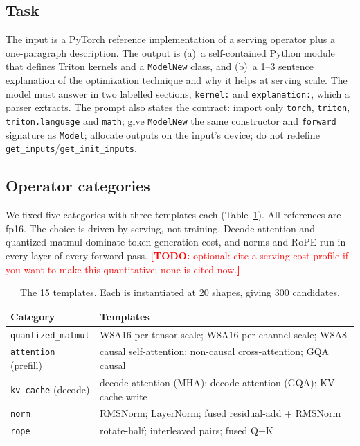 \documentclass[11pt]{article}
\newcommand{\todo}[1]{\textcolor{red}{\textbf{[TODO:} #1\textbf{]}}}
\newcommand{\code}[1]{\texttt{#1}}
\begin{document}
\subsection{Task}
The input is a PyTorch reference implementation of a serving operator plus a one-paragraph
description. The output is (a)~a self-contained Python module that defines Triton kernels and a
\code{ModelNew} class, and (b)~a 1--3 sentence explanation of the optimization technique and why
it helps at serving scale. %
The model must answer in two labelled sections, \code{kernel:} and \code{explanation:}, which a
parser extracts. %
The prompt also states the contract: import only \code{torch}, \code{triton},
\code{triton.language} and \code{math}; give \code{ModelNew} the same constructor and \code{forward}
signature as \code{Model}; allocate outputs on the input's device; do not redefine
\code{get\_inputs}/\code{get\_init\_inputs}. %

\subsection{Operator categories}
We fixed five categories with three templates each (Table~\ref{tab:categories}). All references
are fp16. %
The choice is driven by serving, not training. Decode attention and quantized matmul dominate
token-generation cost, and norms and RoPE run in every layer of every forward pass.
\todo{optional: cite a serving-cost profile if you want to make this quantitative; none is cited now.}

\begin{table}[t]
\centering
\small
\begin{tabular}{@{}ll@{}}
\toprule
Category & Templates \\
\midrule
\code{quantized\_matmul} & W8A16 per-tensor scale; W8A16 per-channel scale; W8A8 \\
\code{attention} (prefill) & causal self-attention; non-causal cross-attention; GQA causal \\
\code{kv\_cache} (decode) & decode attention (MHA); decode attention (GQA); KV-cache write \\
\code{norm} & RMSNorm; LayerNorm; fused residual-add + RMSNorm \\
\code{rope} & rotate-half; interleaved pairs; fused Q+K \\
\bottomrule
\end{tabular}
\caption{The 15 templates. Each is instantiated at 20 shapes, giving 300 candidates.}
\label{tab:categories}
\end{table}
\end{document}
